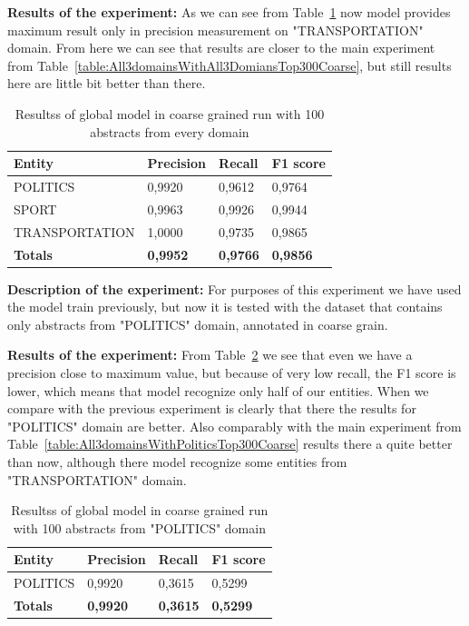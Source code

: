 \documentclass[thesis=M,english]{FITthesis}[2018/05/30]
\begin{document}
	\textbf{Results of the experiment:} As we can see from Table~\ref{table:100GlobalDomainWithAllAbstractsTop100Coarse} now model provides maximum result only in precision measurement on "TRANSPORTATION" domain. From here we can see that results are closer to the main experiment from Table~\ref{table:All3domainsWithAll3DomiansTop300Coarse}, but still results here are little bit better than there. 

	\begin{table}[H]\centering
		\begin{tabular}{|l|l|l|l|}
			\hline {\textbf{Entity}} & {\textbf{Precision}} & {\textbf{Recall}} & {\textbf{F1 score}}\\\hline
				POLITICS & 0,9920 & 0,9612 & 0,9764\\
				SPORT & 0,9963 & 0,9926 & 0,9944\\
				TRANSPORTATION & 1,0000 & 0,9735 & 0,9865\\\hline
				\textbf{Totals} & \textbf{0,9952} & \textbf{0,9766} & \textbf{0,9856}\\\hline
		\end{tabular}
		\caption{Resultss of global model in coarse grained run with 100 abstracts from every domain \label{table:100GlobalDomainWithAllAbstractsTop100Coarse}}
	\end{table}


	\textbf{Description of the experiment:} For purposes of this experiment we have used the model train previously, but now it is tested with the dataset that contains only abstracts from "POLITICS" domain, annotated in coarse grain.

	\textbf{Results of the experiment:} From Table~\ref{table:100GlobalDomainWithPoliticsTop100Coarse} we see that even we have a precision close to maximum value, but because of very low recall, the F1 score is lower, which means that model recognize only half of our entities. When we compare with the previous experiment is clearly that there the results for "POLITICS" domain are better. Also comparably with the main experiment from Table~\ref{table:All3domainsWithPoliticsTop300Coarse} results there a quite better than now, although there model recognize some entities from "TRANSPORTATION" domain.

	\begin{table}[H]\centering
		\begin{tabular}{|l|l|l|l|}
			\hline {\textbf{Entity}} & {\textbf{Precision}} & {\textbf{Recall}} & {\textbf{F1 score}}\\\hline
				POLITICS & 0,9920 & 0,3615 & 0,5299\\\hline
				\textbf{Totals} & \textbf{0,9920} & \textbf{0,3615} & \textbf{0,5299}\\\hline
		\end{tabular}
		\caption{Resultss of global model in coarse grained run with 100 abstracts from "POLITICS" domain \label{table:100GlobalDomainWithPoliticsTop100Coarse}}
	\end{table}
\end{document}
